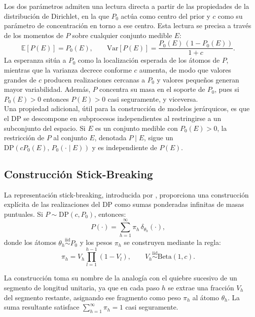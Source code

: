 Los dos parámetros admiten una lectura directa a partir de las propiedades de la distribución de Dirichlet, en la que $P_0$ actúa como centro del prior y $c$ como su parámetro de concentración en torno a ese centro. Esta lectura se precisa a través de los momentos de $P$ sobre cualquier conjunto medible $E$:
\begin{equation}
    \mathbb{E}[P(E)] = P_0(E), \qquad
    \mathrm{Var}[P(E)] = \frac{P_0(E)\,(1 - P_0(E))}{1 + c}.
\end{equation}
La esperanza sitúa a $P_0$ como la localización esperada de los átomos de $P$, mientras que la varianza decrece conforme $c$ aumenta, de modo que valores grandes de $c$ producen realizaciones cercanas a $P_0$ y valores pequeños generan mayor variabilidad. Además, $P$ concentra su masa en el soporte de $P_0$, pues si $P_0(E) > 0$ entonces $P(E) > 0$ casi seguramente, y viceversa.\\

Una propiedad adicional, útil para la construcción de modelos jerárquicos, es que el DP se descompone en subprocesos independientes al restringirse a un subconjunto del espacio. Si $E$ es un conjunto medible con $P_0(E) > 0$, la restricción de $P$ al conjunto $E$, denotada $P \mid E$, sigue un $\mathrm{DP}(c P_0(E),\, P_0(\cdot \mid E))$ y es independiente de $P(E)$.

\subsection{Construcción Stick-Breaking}
\label{02_04_02_stick_breaking}

La representación stick-breaking, introducida por \citet{02_04_sethuraman1994constructive}, proporciona una construcción explícita de las realizaciones del DP como sumas ponderadas infinitas de masas puntuales. Si $P \sim \mathrm{DP}(c, P_0)$, entonces:
\begin{equation}\label{eq:sb_representation}
    P(\cdot) = \sum_{h=1}^{\infty} \pi_h\, \delta_{\theta_h}(\cdot),
\end{equation}
donde los átomos $\theta_h \overset{\mathrm{iid}}{\sim} P_0$ y los pesos $\pi_h$ se construyen mediante la regla:
\begin{equation}\label{eq:02_04_sb_weights}
    \pi_h = V_h \prod_{l=1}^{h-1}(1 - V_l),
    \qquad V_h \overset{\mathrm{iid}}{\sim} \mathrm{Beta}(1, c).
\end{equation}

La construcción toma su nombre de la analogía con el quiebre sucesivo de un segmento de longitud unitaria, ya que en cada paso $h$ se extrae una fracción $V_h$ del segmento restante, asignando ese fragmento como peso $\pi_h$ al átomo $\theta_h$. La suma resultante satisface $\sum_{h=1}^{\infty} \pi_h = 1$ casi seguramente.\\

